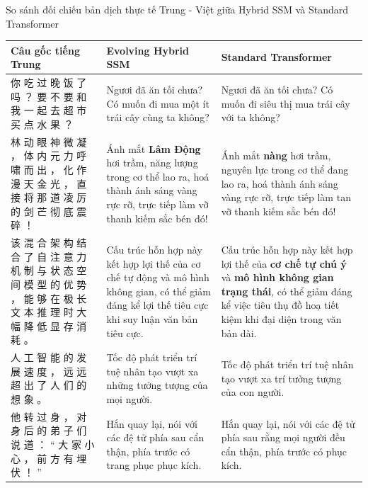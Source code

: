 \documentclass{uetgraduation}
\begin{document}
\begin{table}{So sánh đối chiếu bản dịch thực tế Trung - Việt giữa Hybrid SSM và Standard Transformer}
\centering
\small
\renewcommand{\arraystretch}{1.3}
\begin{tabular}{p{}p{}p{}}
\hline
\textbf{Câu gốc tiếng Trung} & \textbf{Evolving Hybrid SSM} & \textbf{Standard Transformer} \\ \hline
{\sloppy \raggedright \cjkfont 你 吃 过 晚 饭 了 吗 ？ 要 不 要 和 我 一 起 去 超 市 买 点 水 果 ？} & Ngươi đã ăn tối chưa? Có muốn đi mua một ít trái cây cùng ta không? & Ngươi đã ăn tối chưa? Có muốn đi siêu thị mua trái cây với ta không? \\ \hline
{\sloppy \raggedright \cjkfont 林 动 眼 神 微 凝 ， 体 内 元 力 呼 啸 而 出 ， 化 作 漫 天 金 光 ， 直 接 将 那 道 凌 厉 的 剑 芒 彻 底 震 碎 ！} & Ánh mắt \textbf{Lâm Động} hơi trầm, năng lượng trong cơ thể lao ra, hoá thành ánh sáng vàng rực rỡ, trực tiếp làm vỡ thanh kiếm sắc bén đó! & Ánh mắt \textbf{nàng} hơi trầm, nguyên lực trong cơ thể đang lao ra, hoá thành ánh sáng vàng rực rỡ, trực tiếp làm tan vỡ thanh kiếm sắc bén đó! \\ \hline
{\sloppy \raggedright \cjkfont 该 混 合 架 构 结 合 了 自 注 意 力 机 制 与 状 态 空 间 模 型 的 优 势 ， 能 够 在 极 长 文 本 推 理 时 大 幅 降 低 显 存 消 耗 。} & Cấu trúc hỗn hợp này kết hợp lợi thế của cơ chế tự động và mô hình không gian, có thể giảm đáng kể lợi thế tiêu cực khi suy luận văn bản tiêu cực. & Cấu trúc hỗn hợp này kết hợp lợi thế của \textbf{cơ chế tự chú ý} và \textbf{mô hình không gian trạng thái}, có thể giảm đáng kể việc tiêu thụ đồ hoạ tiết kiệm khi đại diện trong văn bản dài. \\ \hline
{\sloppy \raggedright \cjkfont 人 工 智 能 的 发 展 速 度 ， 远 远 超 出 了 人 们 的 想 象 。} & Tốc độ phát triển trí tuệ nhân tạo vượt xa những tưởng tượng của mọi người. & Tốc độ phát triển trí tuệ nhân tạo vượt xa trí tưởng tượng của con người. \\ \hline
{\sloppy \raggedright \cjkfont 他 转 过 身 ， 对 身 后 的 弟 子 们 说 道 ： “ 大 家 小 心 ， 前 方 有 埋 伏 ！ ”} & Hắn quay lại, nói với các đệ tử phía sau cẩn thận, phía trước có trang phục phục kích. & Hắn quay lại, nói với các đệ tử phía sau rằng mọi người đều cẩn thận, phía trước có phục kích. \\ \hline
\end{tabular}
\end{table}
\end{document}
